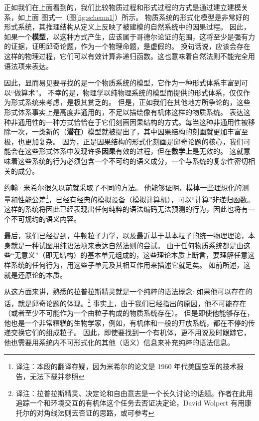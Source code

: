 \documentclass[a4paper,12pt]{article}
\begin{document}
正如我们在上面看到的，我们比较物质过程和形式过程的方式是通过建立建模关系，如上面 图式一（图\ref{fig:schema1}）所示。
物质系统的形式化模型是非常好的形式系统，其推理结构从定义上反映了被建模的自然系统中的因果过程。
因此，如果一个\textbf{模型}，以这种方式产生，应该属于哥德尔论证的范围，这将至少是强有力的证据，证明邱奇论题，作为一个物理命题，是虚假的。
换句话说，应该会存在这样的物理过程，它们可以有效计算非递归函数。这也意味着自然法则不能完全用语法项来表达。

因此，显而易见要寻找的是一个物质系统的模型，它作为一种形式体系丰富到可以“做算术”。
不幸的是，物理学以纯物理系统的模型而提供的形式体系，仅仅作为形式系统来考虑，是极其贫乏的。
但是，正如我们在其他地方所争论的，这些形式体系事实上是高度非通用的，不足以描绘像有机体这样的物质系统\cite{RosenRinpress}。
表达这种非通用性的一种方式恰恰在于它们刻画因果结构的方式。每当这种非通用性被移除一次，一类新的（\textbf{潜在}）模型就被提出了，其中因果结构的刻画就更加丰富至极，也更加复杂。
因为，正是因果结构的形式化刻画是邱奇论题的核心，我们可能会在这些形式体系中发现许多\textbf{因果}有效的过程，但在\textbf{数学上}是无效的。
这就意味着这些系统的行为必须包含一个不可约的语义成分，一个与系统的复杂性密切相关的成分。

约翰·米希尔很久以前就采取了不同的方法\cite{MyhillJ1966}。
他能够证明，模掉一些理想化的测量和性能公差\footnote[1]{译注：本段的翻译存疑，因为米希尔的论文是 1960 年代美国空军的技术报告，无法下载并参照}，已经有经典的\gls{模拟设备}（\gls{模拟计算机}），可以“计算”非递归函数。
这样的系统将因此已经表现出任何纯粹的语法编码无法预测的行为，因此也将有一个不可规约的语义内容。

最后，我们已经提到，牛顿粒子力学，以及最近基于基本粒子的统一物理理论，本身就是一种试图用纯语法项来表达自然法则的尝试。
由于任何物质系统都是由这些“无意义”（即无结构）的基本单元组成的，这些理论本质上断言，要理解任意这样系统的任何行为，用这些子单元及其相互作用来描述它就足矣。
如前所述，这就是还原论的本质。

从这方面来讲，熟悉的拉普拉斯精灵就是一个纯粹的语法概念: 如果他可以存在的话，就是邱奇论题的体现。\footnote[2]{译注：拉普拉斯精灵、决定论和自由意志是一个长久讨论的话题。作者在此用追踪一个和环境交互的有机体这个任务去否证决定论，David Wolpert 有用康托尔的对角线法则去否证的思路，或可参考}
事实上，由于我们已经指出的原因，他不可能存在（或者至少不可能作为一个由粒子构成的物质系统存在）。
但是即使他能够存在，他也是一个非常糟糕的生物学家，例如，有机体和一般的开放系统，都在不停的传递交换它们的组成粒子。
因此，即使要找到一个有机体，更不用说及时跟踪它，他也需要用系统内不可形式化的其他（语义）信息来补充纯粹的语法信息。
\end{document}
